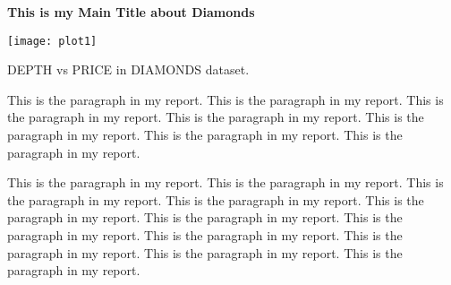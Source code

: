 \documentclass[12pt,english,nohyper]{tufte-handout}\usepackage[]{graphicx}\usepackage[]{color}
\begin{document}
\centerline{\Large\bf This is my Main Title about Diamonds}

\begin{marginfigure}
\texttt{[image: plot1]}
\caption{\label{mar:hist}DEPTH vs PRICE in DIAMONDS dataset.}
\end{marginfigure}

This is the paragraph in my report. This is the paragraph in my report. This is the paragraph in my report. This is the paragraph in my report. This is the paragraph in my report. This is the paragraph in my report. This is the paragraph in my report.

This is the paragraph in my report. This is the paragraph in my report. This is the paragraph in my report. This is the paragraph in my report. This is the paragraph in my report. This is the paragraph in my report. This is the paragraph in my report. This is the paragraph in my report. This is the paragraph in my report. This is the paragraph in my report. This is the paragraph in my report. 

\bigskip{}
\end{document}
